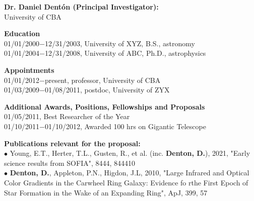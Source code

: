 %
\textbf{\color{Blue}\large Dr. Daniel Dent{\'o}n (Principal Investigator):}\\
University of CBA
\par \vspace{-0.5em}
\textbf{Education}\\
01/01/2000$-$12/31/2003, University of XYZ, B.S., astronomy\\
01/01/2004$-$12/31/2008, University of ABC, Ph.D., astrophysics
\par \vspace{-0.5em}
\textbf{Appointments}\\
01/01/2012$-$present, professor, University of CBA\\
01/03/2009$-$01/08/2011, postdoc, University of ZYX
\par \vspace{-0.5em}
\textbf{Additional Awards, Positions, Fellowships and Proposals}\\
01/05/2011, Best Researcher of the Year\\
01/10/2011$-$01/10/2012, Awarded 100 hrs on Gigantic Telescope
\par \vspace{-0.5em}
\textbf{Publications relevant for the proposal:}\\
{\scriptsize{$\bullet$}} Young, E.T., Herter, T.L., Gusten, R., et al. (inc. \textbf{Denton, D.}), 2021, "Early science results from SOFIA", 8444, 844410\\
{\scriptsize{$\bullet$}} \textbf{Denton, D.}, Appleton, P.N., Higdon, J.L, 2010, "Large Infrared and Optical Color Gradients in the Carwheel Ring Galaxy: Evidence fo rthe First Epoch of Star Formation in the Wake of an Expanding Ring", ApJ, 399, 57
